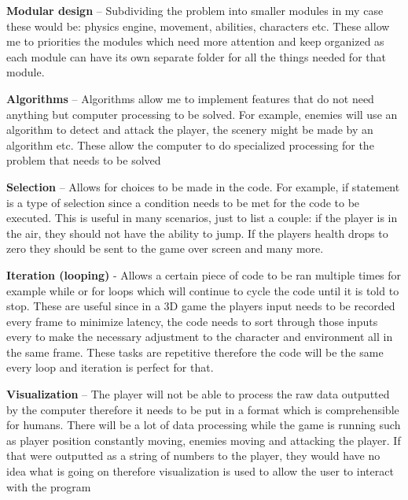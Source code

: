 \documentclass{article}
\newcommand{\parBr}{\vspace{5mm}}%
\begin{document}
\parBr

\textbf{Modular design} – Subdividing the problem into smaller modules in my case these would be: physics engine, movement, abilities, characters etc. These allow me to priorities the modules which need more attention and keep organized as each module can have its own separate folder for all the things needed for that module.

\parBr

\textbf{Algorithms} – Algorithms allow me to implement features that do not need anything but computer processing to be solved. For example, enemies will use an algorithm to detect and attack the player, the scenery might be made by an algorithm etc. These allow the computer to do specialized processing for the problem that needs to be solved 

\parBr

\textbf{Selection} – Allows for choices to be made in the code. For example, if statement is a type of selection since a condition needs to be met for the code to be executed. This is useful in many scenarios, just to list a couple: if the player is in the air, they should not have the ability to jump. If the players health drops to zero they should be sent to the game over screen and many more.

\parBr

\textbf{Iteration (looping)} - Allows a certain piece of code to be ran multiple times for example while or for loops which will continue to cycle the code until it is told to stop. These are useful since in a 3D game the players input needs to be recorded every frame to minimize latency, the code needs to sort through those inputs every to make the necessary adjustment to the character and environment all in the same frame. These tasks are repetitive therefore the code will be the same every loop and iteration is perfect for that.

\parBr

\textbf{Visualization} – The player will not be able to process the raw data outputted by the computer therefore it needs to be put in a format which is comprehensible for humans. There will be a lot of data processing while the game is running such as player position constantly moving, enemies moving and attacking the player. If that were outputted as a string of numbers to the player, they would have no idea what is going on therefore visualization is used to allow the user to interact with the program

\parBr
\end{document}
